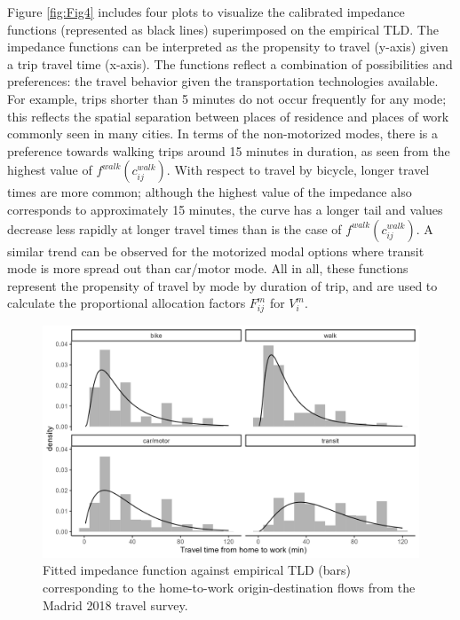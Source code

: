 \documentclass[10pt,letterpaper]{article}
\begin{document}
Figure \ref{fig:Fig4} includes four plots to visualize the calibrated
impedance functions (represented as black lines) superimposed on the
empirical TLD. The impedance functions can be interpreted as the
propensity to travel (y-axis) given a trip travel time (x-axis). The
functions reflect a combination of possibilities and preferences: the
travel behavior given the transportation technologies available. For
example, trips shorter than 5 minutes do not occur frequently for any
mode; this reflects the spatial separation between places of residence
and places of work commonly seen in many cities. In terms of the
non-motorized modes, there is a preference towards walking trips around
15 minutes in duration, as seen from the highest value of
\(f^{walk}(c_{ij}^{walk})\). With respect to travel by bicycle, longer
travel times are more common; although the highest value of the
impedance also corresponds to approximately 15 minutes, the curve has a
longer tail and values decrease less rapidly at longer travel times than
is the case of \(f^{walk}(c_{ij}^{walk})\). A similar trend can be
observed for the motorized modal options where transit mode is more
spread out than car/motor mode. All in all, these functions represent
the propensity of travel by mode by duration of trip, and are used to
calculate the proportional allocation factors \(F_{ij}^m\) for
\(V_i^m\).

\begin{figure}

{\centering \includegraphics[width=0.85\linewidth]{images/tlds_curves_m_plot} 

}

\caption{\label{fig:Fig4} Fitted impedance function  against empirical TLD (bars) corresponding to the home-to-work origin-destination flows from the Madrid 2018 travel survey.}\label{fig:tlds-curves-m-plot}
\end{figure}
\end{document}
